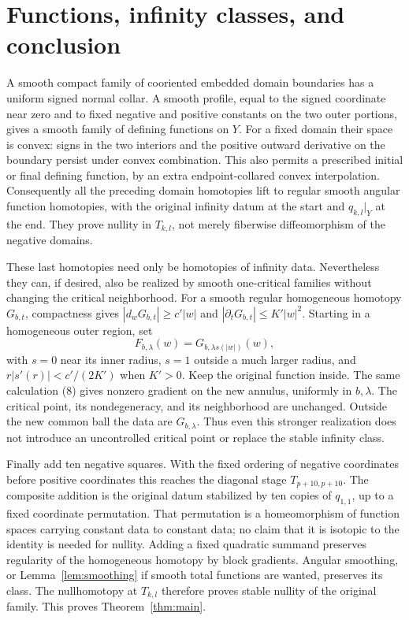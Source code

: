 \documentclass[11pt]{article}
\begin{document}
\section{Functions, infinity classes, and conclusion}

A smooth compact family of cooriented embedded domain boundaries
has a uniform signed normal collar. A smooth profile, equal to
the signed coordinate near zero and to fixed negative and positive
constants on the two outer portions, gives a smooth family of
defining functions on \(Y\).
For a fixed domain their space is convex: signs in the two interiors
and the positive outward derivative on the boundary persist under
convex combination. This also permits a prescribed initial or final
defining function, by an extra endpoint-collared convex interpolation.
Consequently all the preceding domain homotopies lift to regular
smooth angular function homotopies, with the original infinity
datum at the start and \(q_{k,l}|_Y\) at the end.
They prove nullity in \(T_{k,l}\), not merely fiberwise diffeomorphism
of the negative domains.

These last homotopies need only be homotopies of infinity data.
Nevertheless they can, if desired, also be realized by smooth
one-critical families without changing the critical neighborhood.
For a smooth regular homogeneous homotopy \(G_{b,t}\), compactness
gives \(|d_wG_{b,t}|\geq c'|w|\) and
\(|\partial_tG_{b,t}|\leq K'|w|^2\).
Starting in a homogeneous outer region, set
\[
 F_{b,\lambda}(w)=G_{b,\lambda s(|w|)}(w),
 \tag{22}
\]
with \(s=0\) near its inner radius, \(s=1\) outside a much larger
radius, and \(r|s'(r)|<c'/(2K')\) when \(K'>0\).
Keep the original function inside. The same calculation (8)
gives nonzero gradient on the new annulus, uniformly in \(b,\lambda\).
The critical point, its nondegeneracy, and its neighborhood are
unchanged. Outside the new common ball the data are \(G_{b,\lambda}\).
Thus even this stronger realization does not introduce an
uncontrolled critical point or replace the stable infinity class.

Finally add ten negative squares. With the fixed ordering of
negative coordinates before positive coordinates this reaches
the diagonal stage \(T_{p+10,p+10}\).
The composite addition is the original datum stabilized by ten
copies of \(q_{1,1}\), up to a fixed coordinate permutation.
That permutation is a homeomorphism of function spaces carrying
constant data to constant data; no claim that it is isotopic to
the identity is needed for nullity.
Adding a fixed quadratic summand preserves regularity of the
homogeneous homotopy by block gradients. Angular smoothing, or
Lemma~\ref{lem:smoothing} if smooth total functions are wanted,
preserves its class.
The nullhomotopy at \(T_{k,l}\) therefore proves stable nullity
of the original family. This proves Theorem~\ref{thm:main}.
\end{document}
